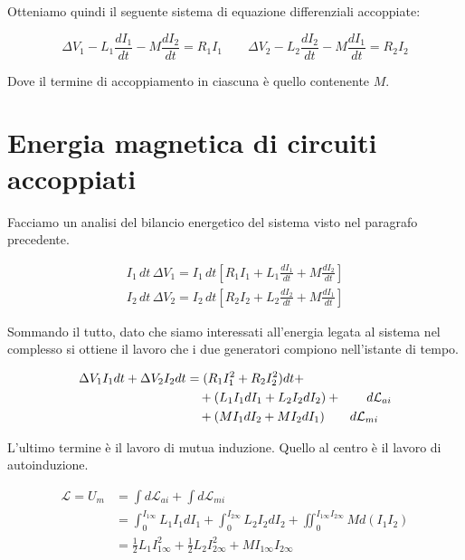 \begin{figure}[htpb]
\end{figure}
\FloatBarrier

Otteniamo quindi il seguente sistema di equazione differenziali accoppiate:

\[
	\Delta V_1 - L_1  \frac{dI_1}{dt} - M \frac{dI_2}{dt} = R_1I_1  \qquad  \Delta V_2 - L_2  \frac{dI_2}{dt} - M \frac{dI_1}{dt} = R_2I_2
\]

Dove il termine di accoppiamento in ciascuna è quello contenente $M$.

\section{Energia magnetica di circuiti accoppiati}

Facciamo un analisi del bilancio energetico del sistema visto nel paragrafo precedente.

\begin{gather*}
	I_1\,dt\,\Delta V_1 = I_1\,dt \left[ R_1I_1+L_1\frac{dI_1}{dt}+M\frac{dI_2}{dt}    \right] \\
	I_2\,dt\,\Delta V_2 = I_2\,dt \left[ R_2I_2+L_2\frac{dI_2}{dt}+M\frac{dI_1}{dt}    \right]
\end{gather*}

Sommando il tutto, dato che siamo interessati all'energia legata al sistema nel complesso si ottiene il lavoro che i due generatori compiono nell'istante di tempo.

\begin{align*}
	\Delta V_1I_1dt + \Delta V_2I_2dt &= (R_1I_1^2 +R_2I_2^2 )dt + \\
	&\quad + (L_1I_1dI_1+L_2I_2dI_2) + \tag*{$d\mathcal{L}_{ai} $}\\
	&\quad + (MI_1dI_2 + MI_2dI_1) \tag*{$d\mathcal{L}_{mi} $}
\end{align*}

L'ultimo termine è il lavoro di mutua induzione. Quello al centro è il lavoro di autoinduzione.

\begin{align*}
	\mathcal{L} = U_m &= \int d\mathcal{L}_{ai} + \int d\mathcal{L}_{mi} \\
	&= \int_0^{I_{1\infty}} L_1I_1dI_1 + \int_0^{I_{2\infty}} L_2I_2dI_2 + \iint_0^{I_{1\infty}I_{2\infty}} M d(I_1I_2) \\		&= \frac{1}{2} L_1I_{1\infty}^2 + \frac{1}{2} L_2I_{2\infty}^2 + MI_{1\infty}I_{2\infty}
\end{align*}

